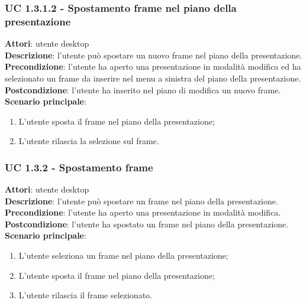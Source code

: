 \subsubsection{UC 1.3.1.2 - Spostamento frame nel piano della presentazione}{
	\label{uc1.3.1.2}
	\textbf{Attori}: utente desktop \\
	\textbf{Descrizione}: l'utente può spostare un nuovo frame nel piano della presentazione. \\
	\textbf{Precondizione}: l'utente ha aperto una presentazione in modalità modifica ed ha selezionato un frame da inserire nel menu a sinistra del piano della presentazione.	\\
	\textbf{Postcondizione}: l'utente ha inserito nel piano di modifica un nuovo frame.	\\
	\textbf{Scenario principale}:
	\begin{enumerate}
		\item L'utente sposta il frame nel piano della presentazione;
		\item L'utente rilascia la selezione sul frame.
	\end{enumerate}
	}
\subsubsection{UC 1.3.2 - Spostamento frame}{
	\label{uc1.3.2}
	\textbf{Attori}: utente desktop \\
	\textbf{Descrizione}: l'utente può spostare un frame nel piano della presentazione. \\
	\textbf{Precondizione}: l'utente ha aperto una presentazione in modalità modifica.	\\
	\textbf{Postcondizione}: l'utente ha spostato un frame nel piano della presentazione.	\\
	\textbf{Scenario principale}:
	\begin{enumerate}
		\item L'utente seleziona un frame nel piano della presentazione;
		\item L'utente sposta il frame nel piano della presentazione;
		\item L'utente rilascia il frame selezionato.
	\end{enumerate}
	}
